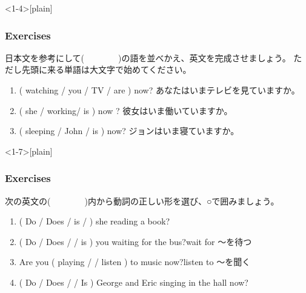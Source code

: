 \documentclass[aspectratio=169,xcolor={dvipsnames,table}]{beamer}
\newcommand{\myaudio}[1]{\href{#1}{\faVolumeUp}}
\begin{document}
\begin{frame}<1-4>[plain]\frametitle{Exercises}

日本文を参考にして(~~~~~~~~)の語を並べかえ、英文を完成させましょう。
ただし先頭に来る単語は大文字で始めてください。



\begin{enumerate}
 \item  ( watching /  you  / TV / are ) now?\hfill%
あなたはいまテレビを見ていますか。\\
 \item ( she / working/ is ) now ?
\hspace{5.3\zw}彼女はいま働いていますか。\\
 \item ( sleeping / John / is ) now?\hspace{4.8\zw}%
ジョンはいま寝ていますか。\\
\end{enumerate}

\mbox{}\hfill{\myaudio{./audio/023_is_ing_question_02.mp3}}
\end{frame}


\begin{frame}<1-7>[plain]\frametitle{Exercises}

次の英文の(~~~~~~~~)内から動詞の正しい形を選び、○で囲みましょう。

\begin{enumerate}
 \item ( Do / Does / is /  ) she reading a book?\hspace{10pt}\raisebox{0pt}{\bcbook}
 \item ( Do / Does /  / is ) you waiting for the bus?\hspace{10pt}\hfill{\scriptsize wait for ～を待つ}
 \item Are you ( playing /  / listen ) to music now?\hfill{\scriptsize listen to ～を聞く}\\
\hfill{}
  \item ( Do / Does /  / Is ) George and Eric singing in the hall now?\hspace{10pt}\\
\hfill{}
\end{enumerate}
\pause

\vfill


\mbox{}\hfill{\myaudio{./audio/023_is_ing_question_03.mp3}}


\end{frame}
\end{document}
